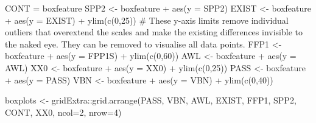 \documentclass[
  letterpaper,
  DIV=11,
  numbers=noendperiod]{scrreprt}
\newenvironment{Shaded}{\begin{snugshade}}{\end{snugshade}}
\newcommand{\AttributeTok}[1]{\textcolor[rgb]{0.40,0.45,0.13}{#1}}
\newcommand{\CommentTok}[1]{\textcolor[rgb]{0.37,0.37,0.37}{#1}}
\newcommand{\DecValTok}[1]{\textcolor[rgb]{0.68,0.00,0.00}{#1}}
\newcommand{\FunctionTok}[1]{\textcolor[rgb]{0.28,0.35,0.67}{#1}}
\newcommand{\NormalTok}[1]{\textcolor[rgb]{0.00,0.23,0.31}{#1}}
\newcommand{\OtherTok}[1]{\textcolor[rgb]{0.00,0.23,0.31}{#1}}
\newcommand{\SpecialCharTok}[1]{\textcolor[rgb]{0.37,0.37,0.37}{#1}}
\begin{document}
\begin{Shaded}
\begin{Highlighting}[]
\NormalTok{CONT }\OtherTok{=}\NormalTok{ boxfeature}
\NormalTok{SPP2 }\OtherTok{\textless{}{-}}\NormalTok{ boxfeature }\SpecialCharTok{+} \FunctionTok{aes}\NormalTok{(}\AttributeTok{y =}\NormalTok{ SPP2) }
\NormalTok{EXIST }\OtherTok{\textless{}{-}}\NormalTok{ boxfeature }\SpecialCharTok{+} \FunctionTok{aes}\NormalTok{(}\AttributeTok{y =}\NormalTok{ EXIST) }\SpecialCharTok{+} \FunctionTok{ylim}\NormalTok{(}\FunctionTok{c}\NormalTok{(}\DecValTok{0}\NormalTok{,}\DecValTok{25}\NormalTok{)) }\CommentTok{\# These y{-}axis limits remove individual outliers that overextend the scales and make the existing differences invisible to the naked eye. They can be removed to visualise all data points.}
\NormalTok{FFP1 }\OtherTok{\textless{}{-}}\NormalTok{ boxfeature }\SpecialCharTok{+} \FunctionTok{aes}\NormalTok{(}\AttributeTok{y =}\NormalTok{ FPP1S) }\SpecialCharTok{+} \FunctionTok{ylim}\NormalTok{(}\FunctionTok{c}\NormalTok{(}\DecValTok{0}\NormalTok{,}\DecValTok{60}\NormalTok{))  }
\NormalTok{AWL }\OtherTok{\textless{}{-}}\NormalTok{ boxfeature }\SpecialCharTok{+} \FunctionTok{aes}\NormalTok{(}\AttributeTok{y =}\NormalTok{ AWL)}
\NormalTok{XX0 }\OtherTok{\textless{}{-}}\NormalTok{ boxfeature }\SpecialCharTok{+} \FunctionTok{aes}\NormalTok{(}\AttributeTok{y =}\NormalTok{ XX0) }\SpecialCharTok{+} \FunctionTok{ylim}\NormalTok{(}\FunctionTok{c}\NormalTok{(}\DecValTok{0}\NormalTok{,}\DecValTok{25}\NormalTok{))}
\NormalTok{PASS }\OtherTok{\textless{}{-}}\NormalTok{ boxfeature }\SpecialCharTok{+} \FunctionTok{aes}\NormalTok{(}\AttributeTok{y =}\NormalTok{ PASS)}
\NormalTok{VBN }\OtherTok{\textless{}{-}}\NormalTok{ boxfeature }\SpecialCharTok{+} \FunctionTok{aes}\NormalTok{(}\AttributeTok{y =}\NormalTok{ VBN) }\SpecialCharTok{+} \FunctionTok{ylim}\NormalTok{(}\FunctionTok{c}\NormalTok{(}\DecValTok{0}\NormalTok{,}\DecValTok{40}\NormalTok{))}

\NormalTok{boxplots }\OtherTok{\textless{}{-}}\NormalTok{ gridExtra}\SpecialCharTok{::}\FunctionTok{grid.arrange}\NormalTok{(PASS, VBN, AWL, EXIST, FFP1, SPP2, CONT, XX0, }\AttributeTok{ncol=}\DecValTok{2}\NormalTok{, }\AttributeTok{nrow=}\DecValTok{4}\NormalTok{)}
\end{Highlighting}
\end{Shaded}
\end{document}

